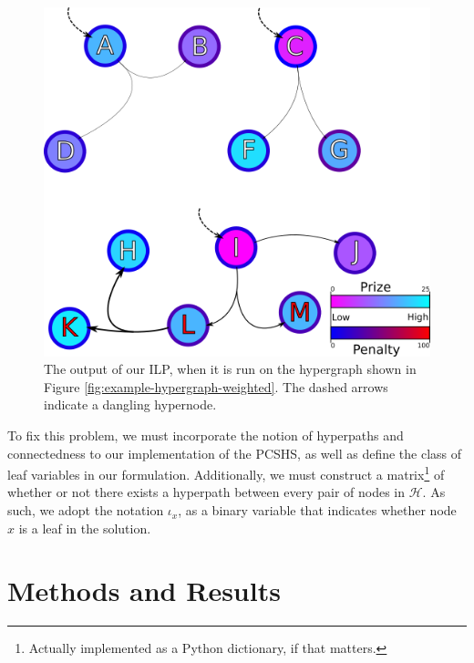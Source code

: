 \documentclass[12pt,twoside]{reedthesis}
\theoremstyle{definition}
\begin{document}
\begin{figure}[th]
  \begin{center}
    \includegraphics{example-hypergraph-weighted-after-ILP}
  \caption[Output from ILP with disconnected sub-hypergraphs]{The output of our ILP, when it is run on the hypergraph shown in Figure \ref{fig:example-hypergraph-weighted}. The dashed arrows indicate a dangling hypernode.}
  \label{fig:example-hypergraph-weighted-after-ILP}
  \end{center}
\end{figure}

To fix this problem, we must incorporate the notion of hyperpaths and connectedness to our implementation of the PCSHS, as well as define the class of leaf variables in our formulation. Additionally, we must construct a matrix\footnote{Actually implemented as a Python dictionary, if that matters.} of whether or not there exists a hyperpath between every pair of nodes in $\mathcal{H}$. As such, we adopt the notation $\iota_x$, as a binary variable that indicates whether node $x$ is a leaf in the solution.

\chapter{Methods and Results}
\end{document}
